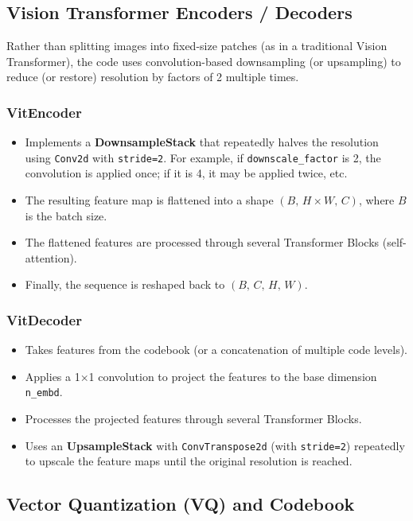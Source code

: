 \documentclass[11pt]{article}
\begin{document}
\subsection{Vision Transformer Encoders / Decoders}

Rather than splitting images into fixed-size patches (as in a traditional Vision Transformer), the code uses convolution-based downsampling (or upsampling) to reduce (or restore) resolution by factors of 2 multiple times.

\subsubsection*{VitEncoder}

\begin{itemize}
  \item Implements a \textbf{DownsampleStack} that repeatedly halves the resolution using \texttt{Conv2d} with \texttt{stride=2}. For example, if \texttt{downscale\_factor} is 2, the convolution is applied once; if it is 4, it may be applied twice, etc.
  \item The resulting feature map is flattened into a shape \((B,\, H \times W,\, C)\), where \(B\) is the batch size.
  \item The flattened features are processed through several Transformer Blocks (self-attention).
  \item Finally, the sequence is reshaped back to \((B,\, C,\, H,\, W)\).
\end{itemize}

\subsubsection*{VitDecoder}

\begin{itemize}
  \item Takes features from the codebook (or a concatenation of multiple code levels).
  \item Applies a 1×1 convolution to project the features to the base dimension \texttt{n\_embd}.
  \item Processes the projected features through several Transformer Blocks.
  \item Uses an \textbf{UpsampleStack} with \texttt{ConvTranspose2d} (with \texttt{stride=2}) repeatedly to upscale the feature maps until the original resolution is reached.
\end{itemize}

\subsection{Vector Quantization (VQ) and Codebook}
\end{document}
